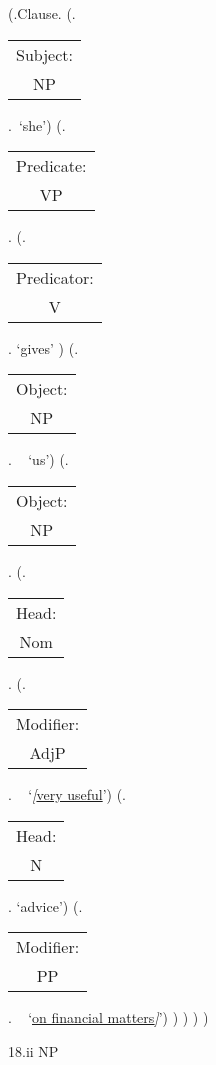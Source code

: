 \documentclass[12pt,letterpaper]{article}
\begin{document}
\begin{figure}
	\begin{center}
		\begin{parsetree}
			(.Clause.
			(.\begin{tabular}{c}Subject:\\NP\end{tabular}.~`she')
			(.\begin{tabular}{c}Predicate:\\VP\end{tabular}.
			(.\begin{tabular}{c}Predicator:\\V\end{tabular}. `gives' )
			(.\begin{tabular}{c}Object:\\NP\end{tabular}.  ~ `us')
			(.\begin{tabular}{c}Object:\\NP\end{tabular}. 
				(.\begin{tabular}{c}Head:\\Nom\end{tabular}. 
					(.\begin{tabular}{c}Modifier:\\AdjP\end{tabular}.  ~ `\emph{[}\underline{very useful}')
					(.\begin{tabular}{c}Head:\\N\end{tabular}. `advice')
					(.\begin{tabular}{c}Modifier:\\PP\end{tabular}.  ~ `\underline{\underline{on financial matters}}\emph{]}')
				)
			)
			)
			)
			
			\hfill \break\hfill \break
		\end{parsetree}
		18.ii NP
	\end{center}
\end{figure}
\end{document}
